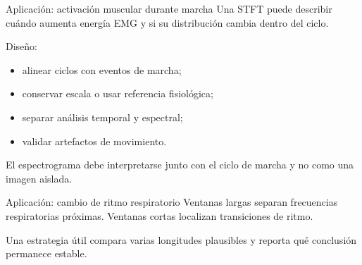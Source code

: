 \documentclass[
  ignorenonframetext,
  aspectratio=169,
  spanish,
]{beamer}
\providecommand{\faExclamation}{\faIcon{exclamation}}
\providecommand{\tightlist}{%
  \setlength{\itemsep}{0pt}\setlength{\parskip}{0pt}}
\begin{document}
\begin{frame}{Aplicación: activación muscular durante marcha}
  \protect{}\label{aplicaciuxf3n-activaciuxf3n-muscular-durante-marcha}
  Una STFT puede describir cuándo aumenta energía EMG y si su distribución
  cambia dentro del ciclo.

  Diseño:

  \begin{itemize}
    \tightlist
    \item
          alinear ciclos con eventos de marcha;
    \item
          conservar escala o usar referencia fisiológica;
    \item
          separar análisis temporal y espectral;
    \item
          validar artefactos de movimiento.
  \end{itemize}

  \begin{tcolorbox}[enhanced jigsaw, arc=.35mm, bottomrule=.15mm, bottomtitle=1mm, breakable, colback=white, colbacktitle=quarto-callout-important-color!10!white, colframe=quarto-callout-important-color-frame, coltitle=black, left=2mm, leftrule=.75mm, opacityback=0, opacitybacktitle=0.6, rightrule=.15mm, title=\textcolor{quarto-callout-important-color}{\faExclamation}\hspace{0.5em}{Importante}, titlerule=0mm, toprule=.15mm, toptitle=1mm]

    El espectrograma debe interpretarse junto con el ciclo de marcha y no
    como una imagen aislada.

  \end{tcolorbox}
\end{frame}

\begin{frame}{Aplicación: cambio de ritmo respiratorio}
  \protect{}\label{aplicaciuxf3n-cambio-de-ritmo-respiratorio}
  Ventanas largas separan frecuencias respiratorias próximas. Ventanas
  cortas localizan transiciones de ritmo.

  \begin{tcolorbox}[enhanced jigsaw, arc=.35mm, bottomrule=.15mm, bottomtitle=1mm, breakable, colback=white, colbacktitle=quarto-callout-note-color!10!white, colframe=quarto-callout-note-color-frame, coltitle=black, left=2mm, leftrule=.75mm, opacityback=0, opacitybacktitle=0.6, rightrule=.15mm, title=\textcolor{quarto-callout-note-color}{\faInfo}\hspace{0.5em}{Nota}, titlerule=0mm, toprule=.15mm, toptitle=1mm]

    Una estrategia útil compara varias longitudes plausibles y reporta qué
    conclusión permanece estable.

  \end{tcolorbox}
\end{frame}
\end{document}
